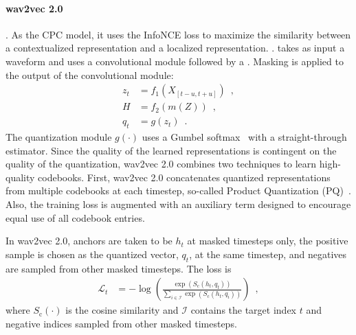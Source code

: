 \paragraph{wav2vec 2.0} 
. As the CPC model, it uses the InfoNCE loss \cite{oord2018representation} to maximize the similarity between a contextualized representation and a localized representation. .  takes as input a waveform and uses a convolutional module  followed by a  . Masking is applied to the output of the convolutional module: 
\begin{align}
    z_t &= f_1(X_{[t-u,t+u]}) \label{w2v2 f_v} \enspace , \\
    H &= f_2(m(Z)) \label{w2v2 f_c} \enspace , \\
    q_t &= g(z_t) \enspace . \label{w2v2 qtz}
\end{align}
\noindent
The quantization module $g(\cdot)$ uses a Gumbel softmax~\cite{Gumbel-Softmax} with a straight-through estimator. Since the quality of the learned representations is contingent on the quality of the quantization, wav2vec 2.0 combines two techniques to learn high-quality codebooks. First, wav2vec 2.0 concatenates quantized representations from multiple codebooks at each timestep, so-called Product Quantization (PQ)~\cite{ProductQuantization}. Also, the  training loss  is augmented with an auxiliary term designed to encourage equal use of all codebook entries. 

In wav2vec 2.0, anchors are taken to be $h_t$ at masked timesteps only, the positive sample is chosen as the quantized vector, $q_t$, at the same timestep, and negatives are sampled from other masked timesteps. The loss is
%
\begin{align}
    \mathcal{L}_t &= - \log \left(\frac{\exp(S_{\text{c}}(h_{t}, q_{t}))}{\sum_{i \in \mathcal{I}} \exp(S_{\text{c}}(h_{t}, q_{i}))} \right) \enspace , \label{w2v2 loss}
\end{align}
%
\noindent where $S_{\text{c}}(\cdot)$ is the cosine similarity and $\mathcal{I}$ contains the target index $t$ and negative indices sampled from other masked timesteps.

